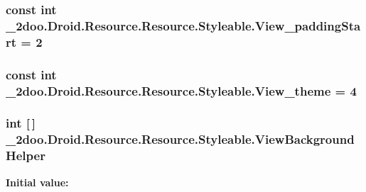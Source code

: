 \hypertarget{class__2doo_1_1_droid_1_1_resource_1_1_styleable_5741384d302235f14e7505c8e9de1f37}{
\subsubsection[{View\_\-paddingStart}]{\setlength{\rightskip}{0pt plus 5cm}const int \_\-2doo.Droid.Resource.Resource.Styleable.View\_\-paddingStart = 2}}
\label{class__2doo_1_1_droid_1_1_resource_1_1_styleable_5741384d302235f14e7505c8e9de1f37}


\hypertarget{class__2doo_1_1_droid_1_1_resource_1_1_styleable_40ba0cb0f193516b92248a1cefb65909}{
\subsubsection[{View\_\-theme}]{\setlength{\rightskip}{0pt plus 5cm}const int \_\-2doo.Droid.Resource.Resource.Styleable.View\_\-theme = 4}}
\label{class__2doo_1_1_droid_1_1_resource_1_1_styleable_40ba0cb0f193516b92248a1cefb65909}


\hypertarget{class__2doo_1_1_droid_1_1_resource_1_1_styleable_9a35bbba744f84ca8ce9e0f3f8935b6c}{
\subsubsection[{ViewBackgroundHelper}]{\setlength{\rightskip}{0pt plus 5cm}int \mbox{[}$\,$\mbox{]} \_\-2doo.Droid.Resource.Resource.Styleable.ViewBackgroundHelper}}
\label{class__2doo_1_1_droid_1_1_resource_1_1_styleable_9a35bbba744f84ca8ce9e0f3f8935b6c}


\textbf{Initial value:}

